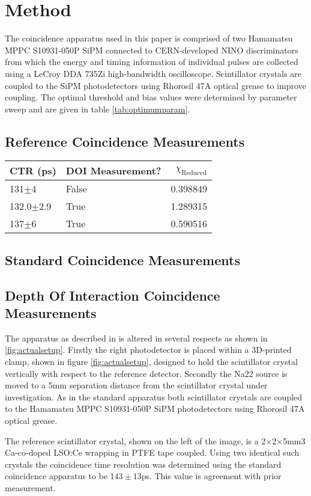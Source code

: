 \section{Method}
The coincidence apparatus used in this paper is comprised of two Hamamatsu MPPC S10931-050P SiPM connected to CERN-developed NINO discriminators from which the energy and timing information of individual pulses are collected using a LeCroy DDA 735Zi high-bandwidth oscilloscope. Scintillator crystals are coupled to the SiPM photodetectors using Rhorosil 47A optical grease to improve coupling. The optimal threshold and bias values were determined by parameter sweep and are given in table \ref{tab:optimumparam}.

\subsection{Reference Coincidence Measurements}

\begin{tabular}{llr}
\hline
       CTR (ps) &    DOI Measurement? &  $\chi_\text{Reduced}$ \\
\hline
     131$\pm$4 &  False &    0.398849 \\
 132.0$\pm$2.9 &   True &    1.289315 \\
     137$\pm$6 &   True &    0.590516 \\
\hline
\end{tabular}

\subsection{Standard Coincidence Measurements}

\subsection{Depth Of Interaction Coincidence Measurements}
The apparatus as described in \cite{arron_Meyer_Pauwels_Lecoq_2012} is altered in several respects as shown in \ref{fig:actualsetup}. Firstly the right photodetector is placed within a 3D-printed clamp, shown in figure \ref{fig:actualsetup}, designed to hold the scintillator crystal vertically with respect to the reference detector. Secondly the Na22 source is moved to a 5mm separation distance from the scintillator crystal under investigation. As in the standard apparatus both scintillator crystals are coupled to the Hamamatsu MPPC S10931-050P SiPM photodetectors using Rhorosil 47A optical grease. 

The reference scintillator crystal, shown on the left of the image, is a 2×2×5mm3 Ca-co-doped LSO:Ce wrapping in PTFE tape coupled. Using two identical such crystals the coincidence time resolution was determined using the standard coincidence apparatus to be $143\pm13$ps. This value is agreement with prior measurement\cite{arron_Meyer_Pauwels_Lecoq_2012}.